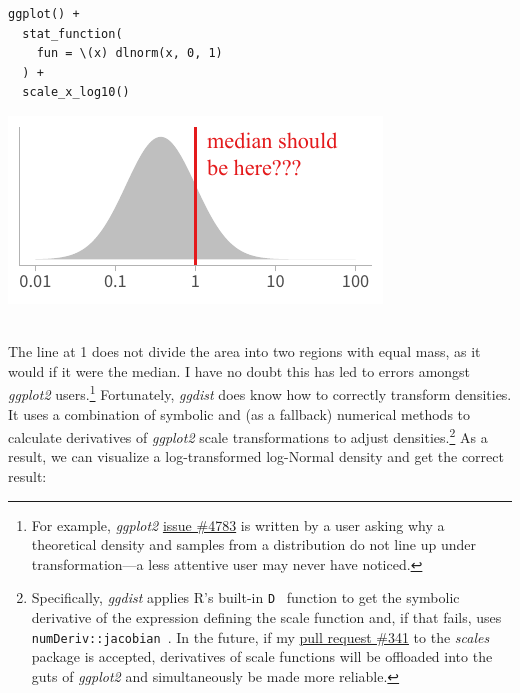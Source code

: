 \documentclass[journal]{vgtc}                     %
\begin{document}
\noindent
\begin{minipage}{.5\columnwidth}
\small
\begin{verbatim}
ggplot() +
  stat_function(
    fun = \(x) dlnorm(x, 0, 1)
  ) +
  scale_x_log10()
\end{verbatim}
\end{minipage}%
  \begin{minipage}{.4\columnwidth}
    \centering
    \includegraphics[width=1.2\columnwidth]{figs/3-jacobian-incorrect.pdf}
  \end{minipage}
\vspace{.5\belowdisplayskip}\\
The line at 1 does not divide the area into two regions with equal mass, as it would if it were the median. I have no doubt this has led to errors amongst \textit{ggplot2} users.\footnote{For example, \textit{ggplot2} \href{https://github.com/tidyverse/ggplot2/issues/4783}{issue \#4783} is written by a user asking why a theoretical density and samples from a distribution do not line up under transformation---a less attentive user may never have noticed.} Fortunately, \textit{ggdist} does know how to correctly transform densities. It uses a combination of symbolic and (as a fallback) numerical methods to calculate derivatives of \textit{ggplot2} scale transformations to adjust densities.\footnote{Specifically, \textit{ggdist} applies R's built-in \texttt{D}~\cite{r2022} function to get the symbolic derivative of the expression defining the scale function and, if that fails, uses \texttt{numDeriv::jacobian}~\cite{gilbert2016numderiv}. In the future, if my \href{https://github.com/r-lib/scales/pull/341}{pull request \#341} to the \textit{scales} package is accepted, derivatives of scale functions will be offloaded into the guts of \textit{ggplot2} and simultaneously be made more reliable.} As a result, we can visualize a log-transformed log-Normal density and get the correct result:
\end{document}
